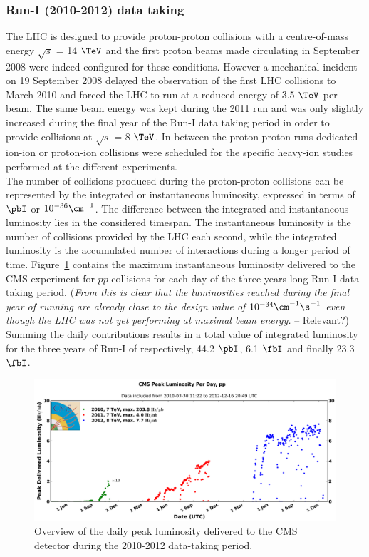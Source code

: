 \subsubsection{Run-I (2010-2012) data taking}

The LHC is  designed to provide proton-proton collisions with a centre-of-mass energy $\sqrt{s}$ = 14 $\TeV$ and the first proton beams made circulating in September 2008 were indeed configured for these conditions. However a mechanical incident on 19 September 2008 delayed the observation of the first LHC collisions to March 2010 and forced the LHC to run at a reduced energy of 3.5 $\TeV$ per beam. The same beam energy was kept during the 2011 run and was only slightly increased during the final year of the Run-I data taking period in order to provide collisions at $\sqrt{s}$ = 8 $\TeV$. In between the proton-proton runs dedicated ion-ion or proton-ion collisions were scheduled for the specific heavy-ion studies performed at the different experiments.
\\
The number of collisions produced during the proton-proton collisions can be represented by the integrated or instantaneous luminosity, expressed in terms of $\pbI$ or $10^{-36} \cm^{-1}$. The difference between the integrated and instantaneous luminosity lies in the considered timespan. The instantaneous luminosity is the number of collisions provided by the LHC each second, while the integrated luminosity is the accumulated number of interactions during a longer period of time. Figure~\ref{fig::InstLumi} contains the maximum instantaneous luminosity delivered to the CMS experiment for $pp$ collisions for each day of the three years long Run-I data-taking period.
(\textit{From this is clear that the luminosities reached during the final year of running are already close to the design value of $10^{-34} \cm^{-1} \s^{-1}$ even though the LHC was not yet performing at maximal beam energy.} -- Relevant?)
Summing the daily contributions results in a total value of integrated luminosity for the three years of Run-I of respectively, 44.2 $\pbI$, 6.1 $\fbI$ and finally 23.3 $\fbI$.
\begin{figure}[h!t]
 \centering
 \includegraphics[width = 0.95 \textwidth]{Chapters/Chapter2_CERN/Figures/InstanteneousLumi_FullRunI.png}
 \caption{Overview of the daily peak luminosity delivered to the CMS detector during the 2010-2012 data-taking period.} 
 \label{fig::InstLumi}
\end{figure}

